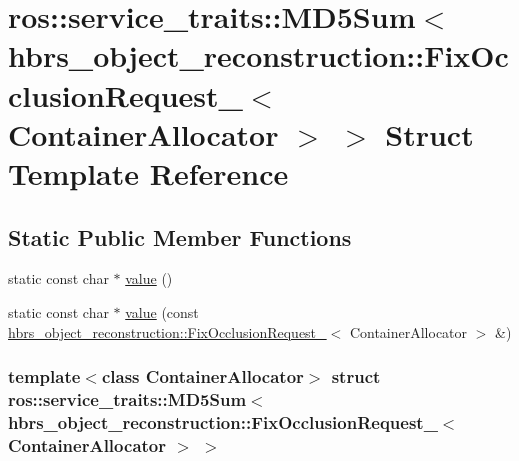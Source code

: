 \hypertarget{structros_1_1service__traits_1_1_m_d5_sum_3_01hbrs__object__reconstruction_1_1_fix_occlusion_req8133090b82d0f7fba2a4e56d69b04acd}{\section{ros\-:\-:service\-\_\-traits\-:\-:\-M\-D5\-Sum$<$ hbrs\-\_\-object\-\_\-reconstruction\-:\-:\-Fix\-Occlusion\-Request\-\_\-$<$ \-Container\-Allocator $>$ $>$ \-Struct \-Template \-Reference}
\label{structros_1_1service__traits_1_1_m_d5_sum_3_01hbrs__object__reconstruction_1_1_fix_occlusion_req8133090b82d0f7fba2a4e56d69b04acd}
}
\subsection*{\-Static \-Public \-Member \-Functions}
\begin{DoxyCompactItemize}
\item 
static const char $\ast$ \hyperlink{structros_1_1service__traits_1_1_m_d5_sum_3_01hbrs__object__reconstruction_1_1_fix_occlusion_req8133090b82d0f7fba2a4e56d69b04acd_acef991d985d59c57a59627986d10b5db}{value} ()
\item 
static const char $\ast$ \hyperlink{structros_1_1service__traits_1_1_m_d5_sum_3_01hbrs__object__reconstruction_1_1_fix_occlusion_req8133090b82d0f7fba2a4e56d69b04acd_aadf5a46154b67b3f0936df80f02e2f84}{value} (const \hyperlink{structhbrs__object__reconstruction_1_1_fix_occlusion_request__}{hbrs\-\_\-object\-\_\-reconstruction\-::\-Fix\-Occlusion\-Request\-\_\-}$<$ \-Container\-Allocator $>$ \&)
\end{DoxyCompactItemize}
\subsubsection*{template$<$class Container\-Allocator$>$ struct ros\-::service\-\_\-traits\-::\-M\-D5\-Sum$<$ hbrs\-\_\-object\-\_\-reconstruction\-::\-Fix\-Occlusion\-Request\-\_\-$<$ Container\-Allocator $>$ $>$}




